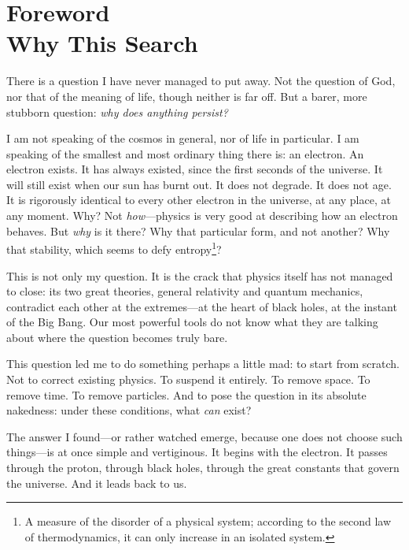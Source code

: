 \documentclass[12pt, a4paper, openright]{book}
\begin{document}
\mainmatter

\chapter*{Foreword \\ Why This Search}

There is a question I have never managed to put away. Not the question of God, nor that of the meaning of life, though neither is far off. But a barer, more stubborn question: \emph{why does anything persist?}

\medskip

I am not speaking of the cosmos in general, nor of life in particular. I am speaking of the smallest and most ordinary thing there is: an electron. An electron exists. It has always existed, since the first seconds of the universe. It will still exist when our sun has burnt out. It does not degrade. It does not age. It is rigorously identical to every other electron in the universe, at any place, at any moment. Why? Not \emph{how}---physics is very good at describing how an electron behaves. But \emph{why} is it there? Why that particular form, and not another? Why that stability, which seems to defy entropy\footnote{A measure of the disorder of a physical system; according to the second law of thermodynamics, it can only increase in an isolated system.}?

\medskip

This is not only my question. It is the crack that physics itself has not managed to close: its two great theories, general relativity and quantum mechanics, contradict each other at the extremes---at the heart of black holes, at the instant of the Big Bang. Our most powerful tools do not know what they are talking about where the question becomes truly bare.

\medskip

This question led me to do something perhaps a little mad: to start from scratch. Not to correct existing physics. To suspend it entirely. To remove space. To remove time. To remove particles. And to pose the question in its absolute nakedness: under these conditions, what \emph{can} exist?

\medskip

The answer I found---or rather watched emerge, because one does not choose such things---is at once simple and vertiginous. It begins with the electron. It passes through the proton, through black holes, through the great constants that govern the universe. And it leads back to us.
\end{document}
